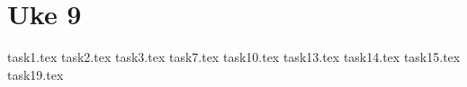 \section{Uke 9}

{task1.tex}
{task2.tex}
{task3.tex}
{task7.tex}
{task10.tex}
{task13.tex}
{task14.tex}
{task15.tex}
{task19.tex}